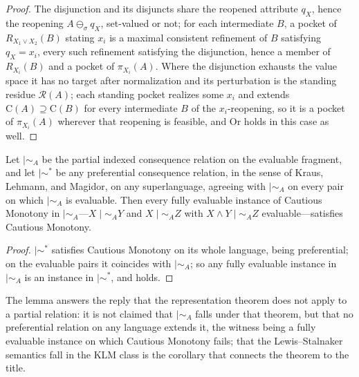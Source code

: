 \begin{proof}
The disjunction and its disjuncts share the reopened attribute $q_X$, hence the reopening $A \ominus_\sigma q_X$, set-valued or not; for each intermediate $B$, a pocket of $R_{X_1 \vee X_2}(B)$ stating $x_i$ is a maximal consistent refinement of $B$ satisfying $q_X = x_i$, every such refinement satisfying the disjunction, hence a member of $R_{X_i}(B)$ and a pocket of $\pi_{X_i}(A)$. Where the disjunction exhausts the value space it has no target after normalization and its perturbation is the standing residue $\mathcal{R}(A)$; each standing pocket realizes some $x_i$ and extends $\mathrm{C}(A) \supseteq \mathrm{C}(B)$ for every intermediate $B$ of the $x_i$-reopening, so it is a pocket of $\pi_{X_i}(A)$ wherever that reopening is feasible, and Or holds in this case as well.
\end{proof}
\begin{lemma}\label{lem:prefext}
Let $\mid\sim_A$ be the partial indexed consequence relation on the evaluable fragment, and let $\mid\sim^{\ast}$ be any preferential consequence relation, in the sense of Kraus, Lehmann, and Magidor, on any superlanguage, agreeing with $\mid\sim_A$ on every pair on which $\mid\sim_A$ is evaluable. Then every fully evaluable instance of Cautious Monotony in $\mid\sim_A$---$X \mid\sim_A Y$ and $X \mid\sim_A Z$ with $X \wedge Y \mid\sim_A Z$ evaluable---satisfies Cautious Monotony.
\end{lemma}
\begin{proof}
$\mid\sim^{\ast}$ satisfies Cautious Monotony on its whole language, being preferential; on the evaluable pairs it coincides with $\mid\sim_A$; so any fully evaluable instance in $\mid\sim_A$ is an instance in $\mid\sim^{\ast}$, and holds.
\end{proof}
\noindent The lemma answers the reply that the representation theorem does not apply to a partial relation: it is not claimed that $\mid\sim_A$ falls under that theorem, but that no preferential relation on any language extends it, the witness being a fully evaluable instance on which Cautious Monotony fails; that the Lewis--Stalnaker semantics fall in the KLM class is the corollary that connects the theorem to the title.

